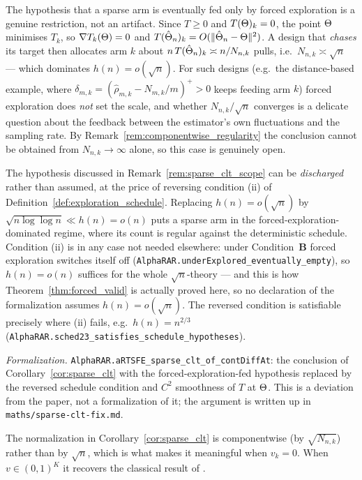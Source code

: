 \begin{remark}\label{rem:sparse_clt_scope}
The hypothesis that a sparse arm is eventually fed only by forced exploration is a genuine
restriction, not an artifact. Since $T\ge0$ and $T(\Theta)_k=0$, the point $\Theta$ minimises
$T_k$, so $\nabla T_k(\Theta)=0$ and $T(\hat{\Theta}_n)_k=O(\|\hat{\Theta}_n-\Theta\|^2)$. A design
that \emph{chases} its target then allocates arm $k$ about $n\,T(\hat{\Theta}_n)_k\asymp n/N_{n,k}$
pulls, i.e.\ $N_{n,k}\asymp\sqrt n$ --- which dominates $h(n)=o(\sqrt n)$. For such designs (e.g.\ the
distance-based example, where $\delta_{m,k}=(\hat\rho_{m,k}-N_{m,k}/m)^+>0$ keeps feeding arm $k$)
forced exploration does \emph{not} set the scale, and whether $N_{n,k}/\sqrt n$ converges is a
delicate question about the feedback between the estimator's own fluctuations and the sampling rate.
By Remark~\ref{rem:componentwise_regularity} the conclusion cannot be obtained from
$N_{n,k}\to\infty$ alone, so this case is genuinely open.
\end{remark}

\begin{remark}\label{rem:sparse_clt_fix}
The hypothesis discussed in Remark~\ref{rem:sparse_clt_scope} can be \emph{discharged} rather than
assumed, at the price of reversing condition (ii) of Definition~\ref{def:exploration_schedule}.
Replacing $h(n)=o(\sqrt n)$ by $\sqrt{n\log\log n}\ll h(n)=o(n)$ puts a sparse arm in the
forced-exploration-dominated regime, where its count is regular against the deterministic schedule.
Condition (ii) is in any case not needed elsewhere: under Condition~\textbf{B} forced exploration
switches itself off (\texttt{AlphaRAR.underExplored\_eventually\_empty}), so $h(n)=o(n)$ suffices for
the whole $\sqrt n$-theory --- and this is how Theorem~\ref{thm:forced_valid} is actually proved
here, so no declaration of the formalization assumes $h(n)=o(\sqrt n)$. The reversed condition is satisfiable precisely where (ii) fails, e.g.\
$h(n)=n^{2/3}$ (\texttt{AlphaRAR.sched23\_satisfies\_schedule\_hypotheses}).

\emph{Formalization.} \texttt{AlphaRAR.aRTSFE\_sparse\_clt\_of\_contDiffAt}: the conclusion of
Corollary~\ref{cor:sparse_clt} with the forced-exploration-fed hypothesis replaced by the reversed
schedule condition and $C^2$ smoothness of $T$ at $\Theta$. This is a deviation from the paper, not
a formalization of it; the argument is written up in \texttt{maths/sparse-clt-fix.md}.
\end{remark}

\begin{remark}\label{rem:sparse_normalization}
The normalization in Corollary~\ref{cor:sparse_clt} is componentwise (by
$\sqrt{N_{n,k}}$) rather than by $\sqrt n$, which is what makes it meaningful when
$v_k=0$. When $v\in(0,1)^K$ it recovers the classical result of
\cite{hu2006asymptotically}.
\end{remark}
